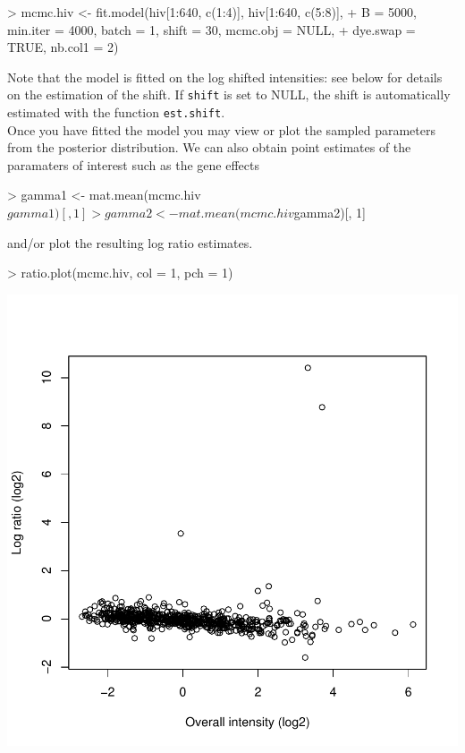 \documentclass[11pt]{article}
\begin{document}
\begin{Schunk}
\begin{Sinput}
> mcmc.hiv <- fit.model(hiv[1:640, c(1:4)], hiv[1:640, c(5:8)], 
+     B = 5000, min.iter = 4000, batch = 1, shift = 30, mcmc.obj = NULL, 
+     dye.swap = TRUE, nb.col1 = 2)
\end{Sinput}
\end{Schunk}
Note that the model is fitted on the log shifted intensities: see below for details on the estimation of the shift.
If {\tt shift} is set to NULL, the shift is automatically estimated with the function {\tt est.shift}. \\
Once you have fitted the model you may view or plot the sampled parameters from the posterior 
distribution. We can also obtain point estimates of the paramaters of interest such as the gene effects
\begin{Schunk}
\begin{Sinput}
> gamma1 <- mat.mean(mcmc.hiv$gamma1)[, 1]
> gamma2 <- mat.mean(mcmc.hiv$gamma2)[, 1]
\end{Sinput}
\end{Schunk}
and/or plot the resulting log ratio estimates.
\begin{center}
\begin{Schunk}
\begin{Sinput}
> ratio.plot(mcmc.hiv, col = 1, pch = 1)
\end{Sinput}
\end{Schunk}
\includegraphics{rama-logratio}
\end{center}
\end{document}
